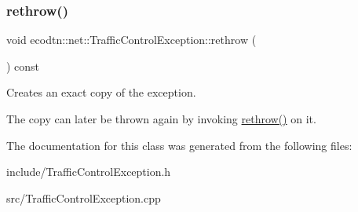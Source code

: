 \subsubsection{\texorpdfstring{rethrow()}{rethrow()}}
{\footnotesize\ttfamily void ecodtn\+::net\+::\+Traffic\+Control\+Exception\+::rethrow (\begin{DoxyParamCaption}{ }\end{DoxyParamCaption}) const\hspace{0.3cm}{\ttfamily [inline]}}

Creates an exact copy of the exception.

The copy can later be thrown again by invoking \hyperlink{classecodtn_1_1net_1_1TrafficControlException_a6f723aac3630fcd2457ffaa63d622b00}{rethrow()} on it. 

The documentation for this class was generated from the following files\+:\begin{DoxyCompactItemize}
\item 
include/Traffic\+Control\+Exception.\+h\item 
src/Traffic\+Control\+Exception.\+cpp\end{DoxyCompactItemize}
